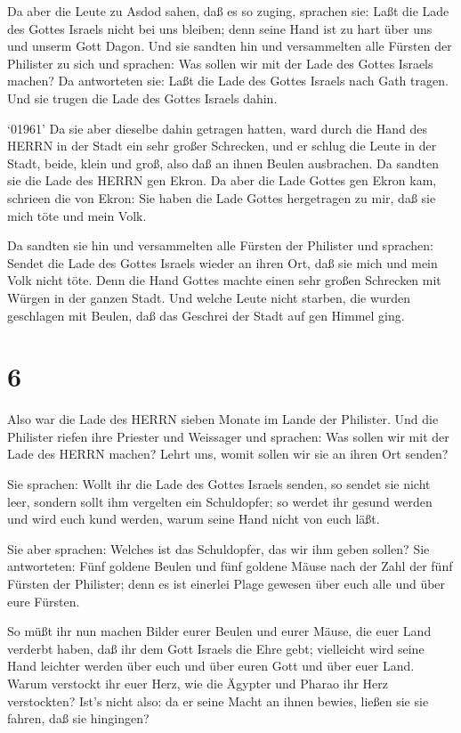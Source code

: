  Da aber die Leute zu Asdod sahen, daß es so zuging,
sprachen sie: Laßt die Lade des Gottes Israels nicht bei uns bleiben;
denn seine Hand ist zu hart über uns und unserm Gott Dagon. 
Und sie sandten hin und versammelten alle Fürsten der Philister zu sich
und sprachen: Was sollen wir mit der Lade des Gottes Israels machen? Da
antworteten sie: Laßt die Lade des Gottes Israels nach Gath tragen. Und
sie trugen die Lade des Gottes Israels dahin.

 `01961' Da sie aber dieselbe dahin getragen hatten, ward
durch die Hand des HERRN in der Stadt ein sehr großer Schrecken, und er
schlug die Leute in der Stadt, beide, klein und groß, also daß an ihnen
Beulen ausbrachen.  Da sandten sie die Lade des HERRN gen
Ekron. Da aber die Lade Gottes gen Ekron kam, schrieen die von Ekron:
Sie haben die Lade Gottes hergetragen zu mir, daß sie mich töte und mein
Volk.

 Da sandten sie hin und versammelten alle Fürsten der
Philister und sprachen: Sendet die Lade des Gottes Israels wieder an
ihren Ort, daß sie mich und mein Volk nicht töte. Denn die Hand Gottes
machte einen sehr großen Schrecken mit Würgen in der ganzen Stadt.
 Und welche Leute nicht starben, die wurden geschlagen mit
Beulen, daß das Geschrei der Stadt auf gen Himmel ging.

\hypertarget{section-5}{%
\section{6}\label{section-5}}

 Also war die Lade des HERRN sieben Monate im Lande der
Philister.  Und die Philister riefen ihre Priester und
Weissager und sprachen: Was sollen wir mit der Lade des HERRN machen?
Lehrt uns, womit sollen wir sie an ihren Ort senden?

 Sie sprachen: Wollt ihr die Lade des Gottes Israels senden,
so sendet sie nicht leer, sondern sollt ihm vergelten ein Schuldopfer;
so werdet ihr gesund werden und wird euch kund werden, warum seine Hand
nicht von euch läßt.

 Sie aber sprachen: Welches ist das Schuldopfer, das wir ihm
geben sollen? Sie antworteten: Fünf goldene Beulen und fünf goldene
Mäuse nach der Zahl der fünf Fürsten der Philister; denn es ist einerlei
Plage gewesen über euch alle und über eure Fürsten.

 So müßt ihr nun machen Bilder eurer Beulen und eurer Mäuse,
die euer Land verderbt haben, daß ihr dem Gott Israels die Ehre gebt;
vielleicht wird seine Hand leichter werden über euch und über euren Gott
und über euer Land.  Warum verstockt ihr euer Herz, wie die
Ägypter und Pharao ihr Herz verstockten? Ist's nicht also: da er seine
Macht an ihnen bewies, ließen sie sie fahren, daß sie hingingen?

